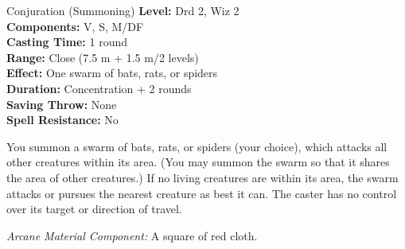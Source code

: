 {Conjuration (Summoning)}
{
	\textbf{Level:}
	Drd 2, Wiz 2\\
	\textbf{Components:}
	V, S, M/DF\\
	\textbf{Casting Time:}
	1 round\\
	\textbf{Range:}
	Close (7.5 m + 1.5 m/2 levels)\\
	\textbf{Effect:}
	One swarm of bats, rats, or spiders\\
	\textbf{Duration:}
	Concentration + 2 rounds\\
	\textbf{Saving Throw:}
	None\\
	\textbf{Spell Resistance:}
	No\\
}
{
	You summon a swarm of bats, rats, or spiders (your choice), which attacks all other creatures within its area. (You may summon the swarm so that it shares the area of other creatures.) If no living creatures are within its area, the swarm attacks or pursues the nearest creature as best it can. The caster has no control over its target or direction of travel.

	\textit{Arcane Material Component:}
	A square of red cloth.

}
